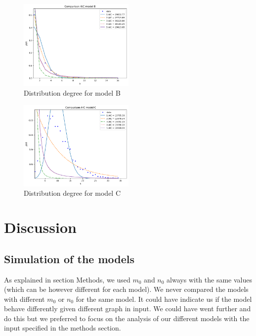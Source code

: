 \documentclass{article}
\begin{document}
\begin{figure}[h]
		\centering
    \includegraphics[width=0.5\textwidth]{modelB/all_dd.png}
    \caption{Distribution degree for model B}
    \label{fig:all_dd_B}
\end{figure}

\begin{figure}[h]
    \centering
    \includegraphics[width=0.5\textwidth]{modelC/all_dd.png}
    \caption{Distribution degree for model C}
    \label{fig:all_dd_C}
\end{figure}


\section{Discussion}

\subsection{Simulation of the models}

As explained in section Methods, we used $m_0$ and $n_0$ always with the same
values (which can be however different for each model). We never compared the
models with different $m_0$ or $n_0$ for the same model. It could have indicate
us if the model behave differently given different graph in input. We could have
went further and do this but we preferred to focus on the analysis of our
different models with the input specified in the methods section.
\end{document}
